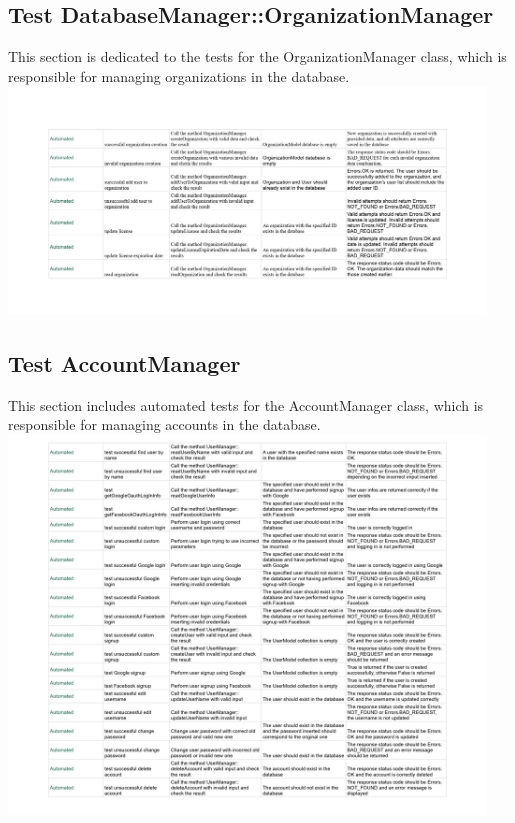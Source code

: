 \documentclass{article}
\begin{document}
\subsection*{Test DatabaseManager::OrganizationManager}
This section is dedicated to the tests for the OrganizationManager class, which is responsible for managing organizations in the database.
\newline
\includegraphics[width=0.95\textwidth]{images/Test_DatabaseManagerOrganizationManager.jpg}

\subsection*{Test AccountManager}
This section includes automated tests for the AccountManager class, which is responsible for managing accounts in the database.
\newline
\includegraphics[width=0.95\textwidth]{images/Test_AccountManager.jpg}
\end{document}
